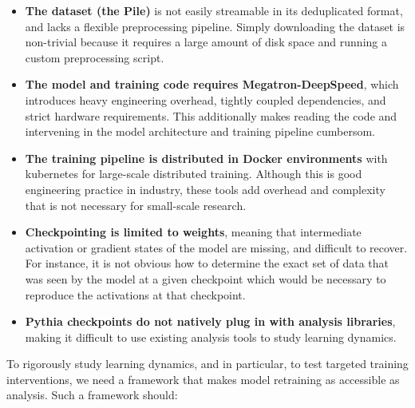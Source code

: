 \begin{itemize}[label=\xmark]
    \item \textbf{The dataset (the Pile)} is not easily streamable in its deduplicated format, and lacks a flexible preprocessing pipeline. Simply downloading the dataset is non-trivial because it requires a large amount of disk space and running a custom preprocessing script.
    \item \textbf{The model and training code requires Megatron-DeepSpeed}, which introduces heavy engineering overhead, tightly coupled dependencies, and strict hardware requirements. This additionally makes reading the code and intervening in the model architecture and training pipeline cumbersom.
    \item \textbf{The training pipeline is distributed in Docker environments} with kubernetes for large-scale distributed training. Although this is good engineering practice in industry, these tools add overhead and complexity that is not necessary for small-scale research.
    \item \textbf{Checkpointing is limited to weights}, meaning that intermediate activation or gradient states of the model are missing, and difficult to recover. For instance, it is not obvious how to determine the exact set of data that was seen by the model at a given checkpoint which would be necessary to reproduce the activations at that checkpoint.
    \item \textbf{Pythia checkpoints do not natively plug in with analysis libraries}, making it difficult to use existing analysis tools to study learning dynamics.
\end{itemize}

To rigorously study learning dynamics, and in particular, to test targeted training interventions, we need a framework that makes model retraining as accessible as analysis. Such a framework should:

